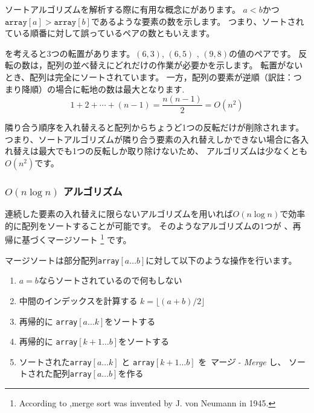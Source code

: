 ソートアルゴリズムを解析する際に有用な概念にがあります。
$a<b$かつ$\texttt{array}[a]>\texttt{array}[b]$であるような要素の数を示します。
つまり、ソートされている順番に対して誤っているペアの数ともいえます。
\begin{center}
\end{center}
を考えると3つの転置があります。$(6,3)$, $(6,5)$ , $(9,8)$の値のペアです。
反転の数は，配列の並べ替えにどれだけの作業が必要かを示します。
転置がないとき、配列は完全にソートされています。
一方，配列の要素が逆順（訳註：つまり降順）の場合に転地の数は最大となります.
\[1+2+\cdots+(n-1)=\frac{n(n-1)}{2} = O(n^2)\]


隣り合う順序を入れ替えると配列からちょうど1つの反転だけが削除されます。
つまり、ソートアルゴリズムが隣り合う要素の入れ替えしかできない場合に各入れ替えは最大でも1つの反転しか取り除けないため、
アルゴリズムは少なくとも$O(n^2)$です。

\subsubsection{$O(n \log n)$ アルゴリズム}


連続した要素の入れ替えに限らないアルゴリズムを用いれば$O(n \log n)$で効率的に配列をソートすることが可能です。
そのようなアルゴリズムの1つが 、再帰に基づくマージソート
\footnote{According to \cite{knu983},merge sort was invented by J. von Neumann in 1945.}
です。

マージソートは部分配列\texttt{array}$[a \ldots b]$に対して以下のような操作を行います。
\begin{enumerate}
\item $a=b$ならソートされているので何もしない
\item 中間のインデックスを計算する $k=\lfloor (a+b)/2 \rfloor$
\item 再帰的に \texttt{array}$[a \ldots k]$をソートする
\item 再帰的に \texttt{array}$[k+1 \ldots b]$をソートする
\item ソートされた\texttt{array}$[a \ldots k]$ と
\texttt{array}$[k+1 \ldots b]$ を \emph{マージ - Merge} し、
ソートされた配列\texttt{array}$[a \ldots b]$を作る
\end{enumerate}


